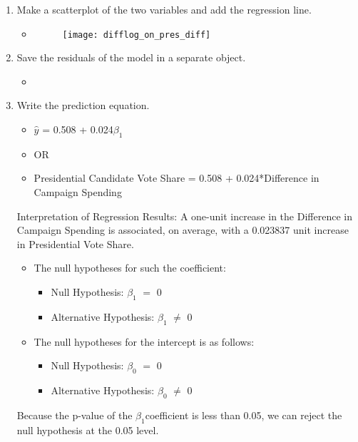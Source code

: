 \documentclass[12pt,letterpaper]{article}
\begin{document}
\begin{enumerate}
		\item Make a scatterplot of the two variables and add the regression line. 
	

\begin{itemize}
	\item 
		\begin{figure}[h]
		\centering
		\texttt{[image: difflog\_on\_pres\_diff]}
	\end{figure} 
\end{itemize}


		\item Save the residuals of the model in a separate object.	

\begin{itemize}
	\item 
\end{itemize}


		\item Write the prediction equation.
		
\begin{itemize}
	\item $\hat{y}$ = 0.508 + 0.024$\beta_1$
	\item OR
	\item Presidential Candidate Vote Share =  0.508 + 0.024*Difference in Campaign Spending
\end{itemize}

\begin{flushleft}Interpretation of Regression Results: A one-unit increase in the Difference in Campaign Spending is associated, on average, with a  0.023837 unit increase in Presidential Vote Share.
	\end{flushleft}

\begin{itemize}
	\item  The null hypotheses for such the coefficient:
	\begin{itemize}
		\item {Null Hypothesis: $\beta_1$ $=$ 0}
		\item {Alternative Hypothesis: $\beta_1$ $\neq$ 0}
	\end{itemize}
	
	\item The null hypotheses for the intercept is as follows:
	\begin{itemize}
		\item {Null Hypothesis: $\beta_0$ $=$ 0}
		\item {Alternative Hypothesis: $\beta_0$ $\neq$ 0}
	\end{itemize}
	
\end{itemize}

\begin{flushleft}Because the p-value of the $\beta_1$coefficient is less than 0.05, we can reject the null hypothesis at the 0.05 level.
	\end{flushleft}

	\end{enumerate}
\end{document}
